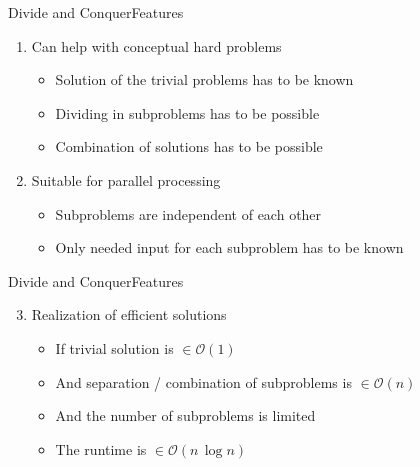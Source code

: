 \begin{frame}{Divide and Conquer}{Features}
  \begin{enumerate}
    \item
      Can help with conceptual hard problems
      \begin{itemize}
        \item
          {\color{Mittel-Blau}Solution} of the trivial problems has to be known
        \item
          {\color{Mittel-Blau}Dividing} in subproblems has to be possible
        \item
          {\color{Mittel-Blau}Combination} of solutions has to be possible
      \end{itemize}
    \item
      Suitable for parallel processing
      \begin{itemize}
        \item
          Subproblems are {\color{Mittel-Blau}independent} of each other
        \item
          Only needed input for each subproblem has to be known
      \end{itemize}
  \end{enumerate}
\end{frame}


\begin{frame}{Divide and Conquer}{Features}
  \begin{enumerate}
    \setcounter{enumi}{2}
    \item
      Realization of {\color{Mittel-Blau}efficient solutions}
      \begin{itemize}
        \item
          If trivial solution is $\in \mathcal{O}(1)$
        \item
          And separation / combination of subproblems is $\in \mathcal{O}(n)$
        \item
          And the number of subproblems is limited
        \item
          The runtime is $\in \mathcal{O}(n \, \log n)$
      \end{itemize}
  \end{enumerate}
\end{frame}


